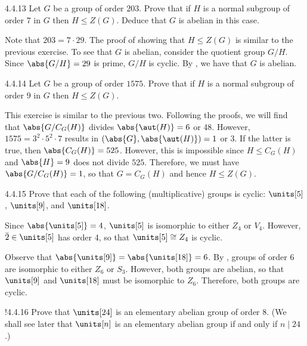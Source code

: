 \begin{exercise}{4.4.13}
	Let $G$ be a group of order $203$.
	Prove that if $H$ is a normal subgroup of order $7$ in $G$ then $H \leq Z(G)$.
	Deduce that $G$ is abelian in this case.
\end{exercise}

\begin{sol}
	Note that $203 = 7 \cdot 29$.
	The proof of showing that $H \leq Z(G)$ is similar to the previous exercise.
	To see that $G$ is abelian, consider the quotient group $G/H$.
	Since $\abs{G/H} = 29$ is prime, $G/H$ is cyclic.
	By , we have that $G$ is abelian.
\end{sol}

\begin{exercise}{4.4.14}
	Let $G$ be a group of order $1575$.
	Prove that if $H$ is a normal subgroup of order $9$ in $G$ then $H \leq Z(G)$.
\end{exercise}

\begin{sol}
	This exercise is similar to the previous two.
	Following the proofs, we will find that $\abs{G/C_G(H)}$ divides $\abs{\aut(H)} = 6$ or 48.
	However, $1575 = 3^2 \cdot 5^2 \cdot 7$ results in $(\abs{G}, \abs{\aut(H)}) = 1$ or 3.
	If the latter is true, then $\abs{C_G(H)} = 525$.
	However, this is impossible since $H \leq C_G(H)$ and $\abs{H} = 9$ does not divide $525$.
	Therefore, we must have $\abs{G/C_G(H)} = 1$, so that $G = C_G(H)$ and hence $H \leq Z(G)$.
\end{sol}

\begin{exercise}{4.4.15}
	Prove that each of the following (multiplicative) groups is cyclic: $\units[5]$, $\units[9]$, and $\units[18]$.
\end{exercise}

\begin{sol}
	Since $\abs{\units[5]} = 4$, $\units[5]$ is isomorphic to either $Z_4$ or $V_4$.
	However, $\bar 2 \in \units[5]$ has order 4, so that $\units[5] \cong Z_4$ is cyclic.

	Observe that $\abs{\units[9]} = \abs{\units[18]} = 6$.
	By , groups of order 6 are isomorphic to either $Z_6$ or $S_3$.
	However, both groups are abelian, so that $\units[9]$ and $\units[18]$ must be isomorphic to $Z_6$.
	Therefore, both groups are cyclic.
\end{sol}

\begin{exercise}!{4.4.16}
	Prove that $\units[24]$ is an elementary abelian group of order $8$. (We shall see later that $\units[n]$ is an elementary abelian group if and only if $n \mid 24$.)
\end{exercise}

